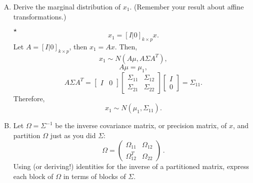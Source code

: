 \documentclass[11pt]{article}
\newcommand{\jie}{$\star$ }
\begin{document}
\begin{enumerate}[(A)]

\item Derive the marginal distribution of $x_1$. (Remember your result about affine transformations.)

\bigskip

\jie
$$x_1 = \left[ I | 0 \right]_{k \times p} x.$$
Let $A = \left[ I | 0 \right]_{k \times p}$, then $x_1 = Ax$. Then,
$$x_1 \sim N(A\mu, A\Sigma A^T),$$
$$A\mu=\mu_1,$$
$$A\Sigma A^T =\begin{bmatrix}
I & 0
\end{bmatrix}
\begin{bmatrix}
\Sigma_{11} & \Sigma_{12} \\
\Sigma_{21} & \Sigma_{22}
\end{bmatrix}
\begin{bmatrix}
I \\
0
\end{bmatrix} = \Sigma_{11}.$$
Therefore,
$$x_1 \sim N(\mu_1, \Sigma_{11}).$$

\bigskip

\item Let $\Omega = \Sigma^{-1}$ be the inverse covariance matrix, or precision matrix, of $x$, and partition $\Omega$ just as you did $\Sigma$:
$$
\Omega =
\left(
\begin{array}{cc}
\Omega_{11} & \Omega_{12} \\
\Omega_{12}^T & \Omega_{22} 
\end{array}
\right) \, .
$$
Using (or deriving!) identities for the inverse of a partitioned matrix, express each block of $\Omega$ in terms of blocks of $\Sigma$.

\bigskip


\end{enumerate}
\end{document}
